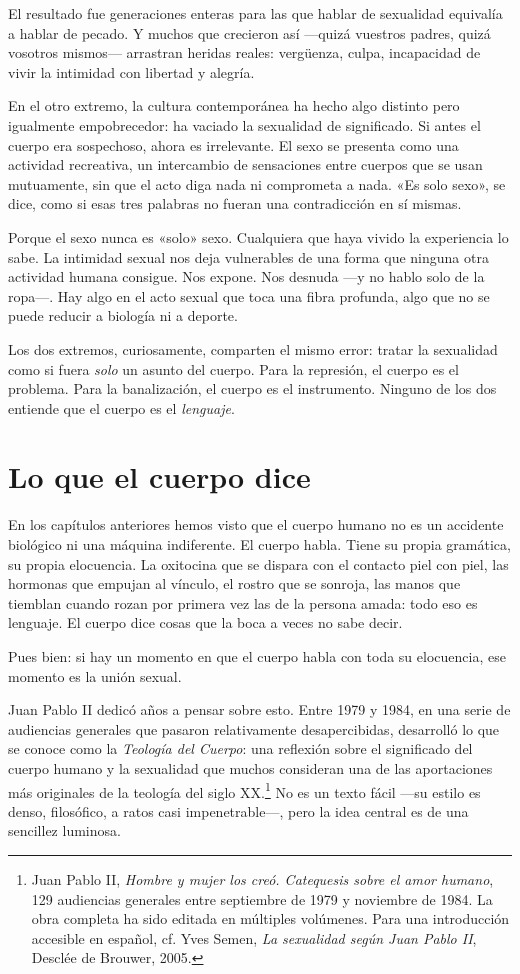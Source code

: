 El resultado fue generaciones enteras para las que hablar de sexualidad equivalía a hablar de pecado. Y muchos que crecieron así ---quizá vuestros padres, quizá vosotros mismos--- arrastran heridas reales: vergüenza, culpa, incapacidad de vivir la intimidad con libertad y alegría.

En el otro extremo, la cultura contemporánea ha hecho algo distinto pero igualmente empobrecedor: ha vaciado la sexualidad de significado. Si antes el cuerpo era sospechoso, ahora es irrelevante. El sexo se presenta como una actividad recreativa, un intercambio de sensaciones entre cuerpos que se usan mutuamente, sin que el acto diga nada ni comprometa a nada. «Es solo sexo», se dice, como si esas tres palabras no fueran una contradicción en sí mismas.

Porque el sexo nunca es «solo» sexo. Cualquiera que haya vivido la experiencia lo sabe. La intimidad sexual nos deja vulnerables de una forma que ninguna otra actividad humana consigue. Nos expone. Nos desnuda ---y no hablo solo de la ropa---. Hay algo en el acto sexual que toca una fibra profunda, algo que no se puede reducir a biología ni a deporte.

Los dos extremos, curiosamente, comparten el mismo error: tratar la sexualidad como si fuera \emph{solo} un asunto del cuerpo. Para la represión, el cuerpo es el problema. Para la banalización, el cuerpo es el instrumento. Ninguno de los dos entiende que el cuerpo es el \emph{lenguaje}.

\section{Lo que el cuerpo dice}

En los capítulos anteriores hemos visto que el cuerpo humano no es un accidente biológico ni una máquina indiferente. El cuerpo habla. Tiene su propia gramática, su propia elocuencia. La oxitocina que se dispara con el contacto piel con piel, las hormonas que empujan al vínculo, el rostro que se sonroja, las manos que tiemblan cuando rozan por primera vez las de la persona amada: todo eso es lenguaje. El cuerpo dice cosas que la boca a veces no sabe decir.

Pues bien: si hay un momento en que el cuerpo habla con toda su elocuencia, ese momento es la unión sexual.

Juan Pablo II dedicó años a pensar sobre esto. Entre 1979 y 1984, en una serie de audiencias generales que pasaron relativamente desapercibidas, desarrolló lo que se conoce como la \emph{Teología del Cuerpo}: una reflexión sobre el significado del cuerpo humano y la sexualidad que muchos consideran una de las aportaciones más originales de la teología del siglo XX.\footnote{Juan Pablo II, \textit{Hombre y mujer los creó. Catequesis sobre el amor humano}, 129 audiencias generales entre septiembre de 1979 y noviembre de 1984. La obra completa ha sido editada en múltiples volúmenes. Para una introducción accesible en español, cf. Yves Semen, \textit{La sexualidad según Juan Pablo II}, Desclée de Brouwer, 2005.} No es un texto fácil ---su estilo es denso, filosófico, a ratos casi impenetrable---, pero la idea central es de una sencillez luminosa.

